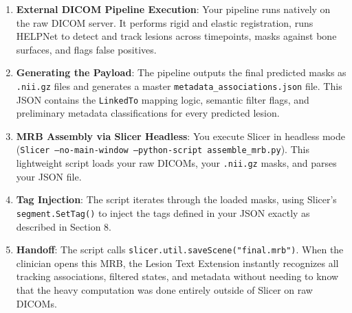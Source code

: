 \documentclass[a4paper,10pt]{article}
\begin{document}
\begin{enumerate}
    \item \textbf{External DICOM Pipeline Execution}: Your pipeline runs natively on the raw DICOM server. It performs rigid and elastic registration, runs HELPNet to detect and track lesions across timepoints, masks against bone surfaces, and flags false positives.
    \item \textbf{Generating the Payload}: The pipeline outputs the final predicted masks as \texttt{.nii.gz} files and generates a master \texttt{metadata\_associations.json} file. This JSON contains the \texttt{LinkedTo} mapping logic, semantic filter flags, and preliminary metadata classifications for every predicted lesion.
    \item \textbf{MRB Assembly via Slicer Headless}: You execute Slicer in headless mode (\texttt{Slicer --no-main-window --python-script assemble\_mrb.py}). This lightweight script loads your raw DICOMs, your \texttt{.nii.gz} masks, and parses your JSON file.
    \item \textbf{Tag Injection}: The script iterates through the loaded masks, using Slicer's \texttt{segment.SetTag()} to inject the tags defined in your JSON exactly as described in Section 8.
    \item \textbf{Handoff}: The script calls \texttt{slicer.util.saveScene("final.mrb")}. When the clinician opens this MRB, the Lesion Text Extension instantly recognizes all tracking associations, filtered states, and metadata without needing to know that the heavy computation was done entirely outside of Slicer on raw DICOMs.
\end{enumerate}
\end{document}

